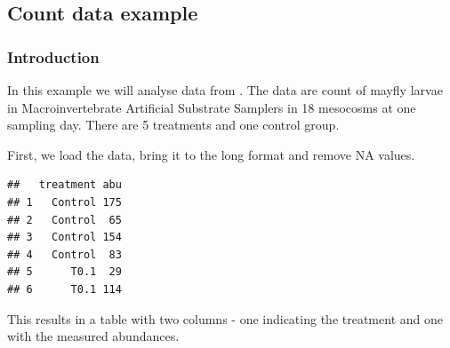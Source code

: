 

\subsection{Count data example}
\subsubsection{Introduction}
In this example we will analyse data from \citep{brock_minimum_2015}.
The data are count of mayfly larvae in Macroinvertebrate Artificial Substrate Samplers in 18 mesocosms at one sampling day.
There are 5 treatments and one control group.

First, we load the data, bring it to the long format and remove NA values.
\begin{knitrout}
\color{fgcolor}\begin{kframe}
\begin{alltt}
 \hlkwb{<-} \hlstd{(} \hlstd{=} \hlstd{,}
                  \hlstd{=} \hlstd{)}
 \hlkwb{<-}   \hlstd{=} \hlstd{,}  \hlstd{=} \hlstd{)}
 \hlkwb{<-} \hlstd{dfm[}\hlopt{!}\hlstd{(dfm[}\hlstd{]), ]}
\end{alltt}
\begin{verbatim}
##   treatment abu
## 1   Control 175
## 2   Control  65
## 3   Control 154
## 4   Control  83
## 5      T0.1  29
## 6      T0.1 114
\end{verbatim}
\end{kframe}
\end{knitrout}
This results in a table with two columns - one indicating the treatment and one with the measured abundances.

